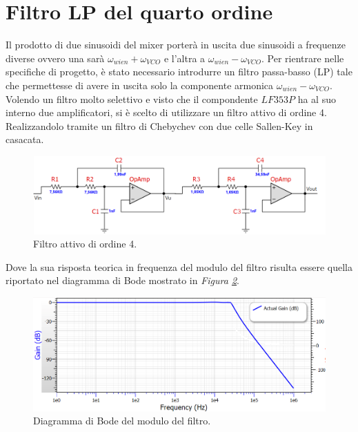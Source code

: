 \documentclass[titlepage]{report}
\begin{document}
\section{Filtro LP del quarto ordine}
	Il prodotto di due sinusoidi del mixer porterà in uscita due sinusoidi a frequenze diverse ovvero una sarà $\omega_{wien} + \omega_{VCO}$ e l'altra a $\omega_{wien} - \omega_{VCO}$. Per rientrare nelle specifiche di progetto, è stato necessario introdurre un filtro passa-basso (LP) tale che permettesse di avere in uscita solo la componente armonica $\omega_{wien} - \omega_{VCO}$.
	\\ 
	Volendo un filtro molto selettivo e visto che il compondente $LF353P$ ha al suo interno due amplificatori, si è scelto di utilizzare un filtro attivo di ordine 4. Realizzandolo tramite un filtro di Chebychev con due celle Sallen-Key in casacata. 
	
	\begin{figure}[H]
		\centering
		\includegraphics[scale=0.9]{Immagini/sch_lp4.png}
		\caption{Filtro attivo di ordine 4.}
		\label{fig:LP4}
	\end{figure}	
	
	\noindent Dove la sua risposta teorica in frequenza del modulo del filtro risulta essere quella riportato nel diagramma di Bode mostrato in \textit{Figura \ref{fig:BodeLp4}}.
	
	\begin{figure}[H]
		\centering
		\includegraphics[scale=0.9]{Immagini/bode_teorico_lp4.png}
		\caption{Diagramma di Bode del modulo del filtro.}
		\label{fig:BodeLp4}
	\end{figure}
\end{document}

